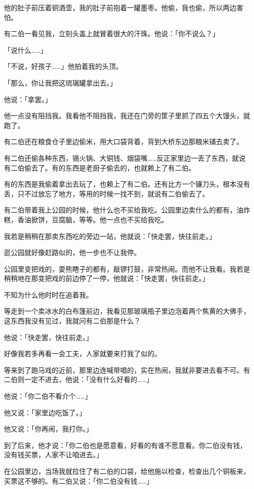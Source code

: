 \documentclass[UTF8]{ctexart}
\begin{document}
他的肚子前压着铜酒壶，我的肚子前抱着一罐墨枣。他偷，我也偷，所以两边害怕。

有二伯一看见我，立刻头盖上就冒着很大的汗珠。他说：「你不说么？」

「说什么……」

「不说，好孩子……」他拍着我的头顶。

「那么，你让我把这琉璃罐拿出去。」

他说：「拿罢。」

他一点没有阻挡我。我看他不阻挡我，我还在门旁的筐子里抓了四五个大馒头，就跑了。

有二伯还在粮食仓子里边偷米，用大口袋背着，背到大桥东边那粮米铺去卖了。

有二伯还偷各种东西，锡火锅、大铜钱、烟袋嘴……反正家里边一丢了东西，就说有二伯偷去了。有的东西是老厨子偷去的，也就赖上了有二伯。

有的东西是我偷着拿出去玩了，也赖上了有二伯。还有比方一个镰刀头，根本没有丢，只不过放忘了地方，等用的时候一找不到，就说有二伯偷去了。

有二伯带着我上公园的时候，他什么也不买给我吃。公园里边卖什么的都有，油炸糕，香油掀饼，豆腐脑，等等。他一点也不买给我吃。

我若是稍稍在那卖东西吃的旁边一站，他就说：「快走罢，快往前走。」

逛公园就好像赶路似的，他一步也不让我停。

公园里变把戏的，耍熊瞎子的都有，敲锣打鼓，非常热闹。而他不让我看。我若是稍稍地在那变把戏的前边停了一停，他就说：「快走罢，快往前走。」

不知为什么他时时在追着我。

等走到一个卖冰水的白布篷前边，我看见那玻璃瓶子里边泡着两个焦黄的大佛手，这东西我没有见过，我就问有二伯那是什么？

他说：「快走罢，快往前走。」

好像我若多再看一会工夫，人家就要来打我了似的。

等来到了跑马戏的近前，那里边连喊带唱的，实在热闹，我就非要进去看不可。有二伯则一定不进去，他说：「没有什么好看的……」

他说：「你二伯不看介个……」

他又说：「家里边吃饭了。」

他又说：「你再闹，我打你。」

到了后来，他才说：「你二伯也是愿意看，好看的有谁不愿意看。你二伯没有钱，没有钱买票，人家不让咱进去。」

在公园里边，当场我就拉住了有二伯的口袋，给他施以检查，检查出几个铜板来，买票这不够的。有二伯又说：「你二伯没有钱……」
\end{document}
